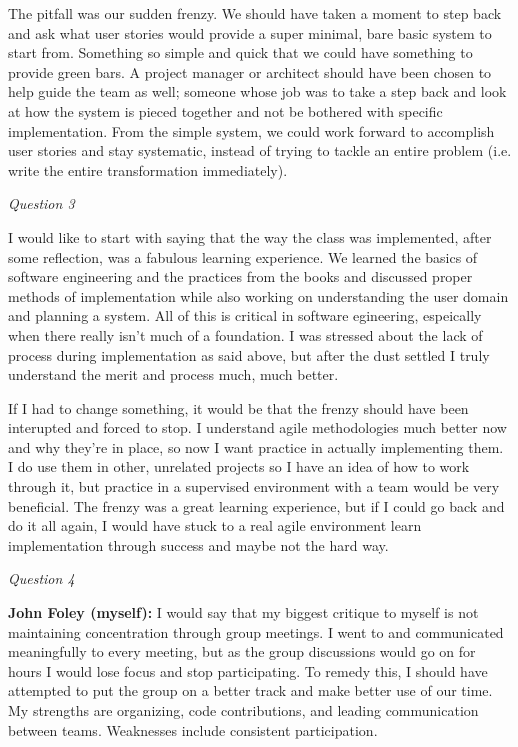 \documentclass[11pt]{article}
\newcommand{\tab}{\hspace*{2em}}
\begin{document}
\begin{doublespace}
\tab The pitfall was our sudden frenzy. We should have taken a moment to step back and ask what user stories would provide a super minimal, bare basic system to start from. Something so simple and quick that we could have something to provide green bars. A project manager or architect should have been chosen to help guide the team as well; someone whose job was to take a step back and look at how the system is pieced together and not be bothered with specific implementation. From the simple system, we could work forward to accomplish user stories and stay systematic, instead of trying to tackle an entire problem (i.e. write the entire transformation immediately). 

\emph{Question 3}

\tab I would like to start with saying that the way the class was implemented, after some reflection, was a fabulous learning experience. We learned the basics of software engineering and the practices from the books and discussed proper methods of implementation while also working on understanding the user domain and planning a system. All of this is critical in software egineering, espeically when there really isn't much of a foundation. I was stressed about the lack of process during implementation as said above, but after the dust settled I truly understand the merit and process much, much better. 

\tab If I had to change something, it would be that the frenzy should have been interupted and forced to stop. I understand agile methodologies much better now and why they're in place, so now I want practice in actually implementing them. I do use them in other, unrelated projects so I have an idea of how to work through it, but practice in a supervised environment with a team would be very beneficial. The frenzy was a great learning experience, but if I could go back and do it all again, I would have stuck to a real agile environment learn implementation through success and maybe not the hard way.

\emph{Question 4}

\textbf{John Foley (myself):} I would say that my biggest critique to myself is not maintaining concentration through group meetings. I went to and communicated meaningfully to every meeting, but as the group discussions would go on for hours I would lose focus and stop participating. To remedy this, I should have attempted to put the group on a better track and make better use of our time. My strengths are organizing, code contributions, and leading communication between teams. Weaknesses include consistent participation.


\end{doublespace}
\end{document}
